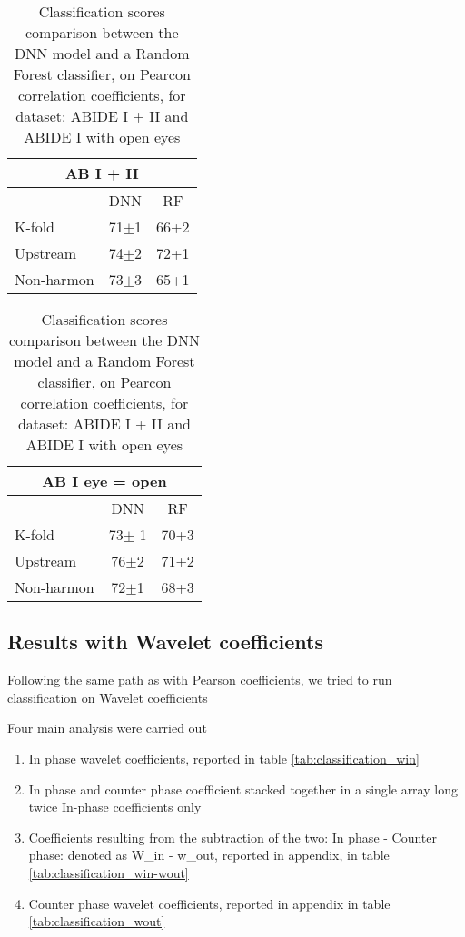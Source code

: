 \documentclass[a4paper,11pt]{article}
\begin{document}
\begin{table}[h]
    \begin{subtable}[h]{0.45\textwidth}
        \centering
        \begin{tabular}{|lcc|}\toprule
        \multicolumn{3}{|c|}{AB I + II} \\\midrule
        &DNN &RF \\
        K-fold &71$\pm$1 &66+2 \\
        Upstream &74$\pm$2 &72+1 \\
        Non-harmon &73$\pm$3 &65+1 \\
        \bottomrule
        \end{tabular}
    \end{subtable}
   \begin{subtable}[h]{0.45\textwidth}
       \centering
       \begin{tabular}{|lcc|}\toprule
       \multicolumn{3}{|c|}{AB I eye = open} \\\midrule
       &DNN &RF \\
       K-fold &73$\pm$ 1 &70+3 \\
       Upstream &76$\pm$2 &71+2 \\
       Non-harmon &72$\pm$1 &68+3 \\
       \bottomrule
       \end{tabular}
    \end{subtable}
    \caption{Classification scores comparison between the DNN model and a Random Forest classifier, on Pearcon correlation coefficients, for dataset: ABIDE I + II and ABIDE I with open eyes}
    \label{tab:comparison_dnn_rf_pearson}
\end{table}


\newpage

\subsection{Results with Wavelet coefficients}

Following the same path as with Pearson coefficients, we tried to run classification on Wavelet coefficients

Four main analysis were carried out

\begin{enumerate}
\item In phase wavelet coefficients, reported in table \ref{tab:classification_win}
\item In phase and counter phase coefficient stacked together in a single array long twice In-phase coefficients only
\item Coefficients resulting from the subtraction of the two: In phase - Counter phase: denoted as W\_in - w\_out, reported in appendix, in table \ref{tab:classification_win-wout}
\item Counter phase wavelet coefficients, reported in appendix in table \ref{tab:classification_wout}
\end{enumerate}
\end{document}
